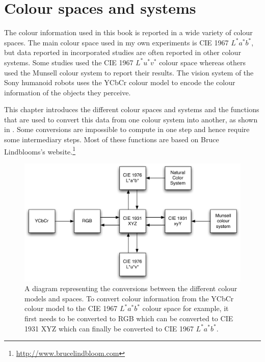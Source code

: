 \chapter{Colour spaces and systems}
\label{s:spaces}

The colour information used in this book is reported in a wide
variety of colour spaces. The main colour space used in my own
experiments is CIE 1967 $L^*a^*b^*$, but data reported in incorporated
studies are often reported in other colour systems. Some studies
\citep[e.g.][]{lillo07locating} used the CIE 1967 $L^*u^*v^*$ colour
space whereas others \citep[e.g.][]{sturges95location} used the
Munsell colour system to report their results. The vision system of
the Sony humanoid robots uses the YCbCr colour model to encode the
colour information of the objects they perceive.

This chapter introduces the different colour spaces and systems and
the functions that are used to convert this data from one colour
system into another, as shown in . Some
conversions are impossible to compute in one step and hence require
some intermediary steps. Most of these functions are based on Bruce
Lindblooms's website.\footnote{\url{http://www.brucelindbloom.com}}

\begin{figure}[htb]
\begin{center}
\includegraphics[width=.8\textwidth]{./spaces/figures/conversions.pdf}
\caption[Conversion diagram between different colour models and
spaces]{A diagram representing the conversions between the different
  colour models and spaces. To convert colour information from the
  YCbCr colour model to the CIE 1967 $L^*a^*b^*$ colour space for
  example, it first needs to be converted to RGB which can be
  converted to CIE 1931 XYZ which can finally be converted to CIE 1967
  $L^*a^*b^*$.}
\label{f:conversions}
\end{center}
\end{figure}

